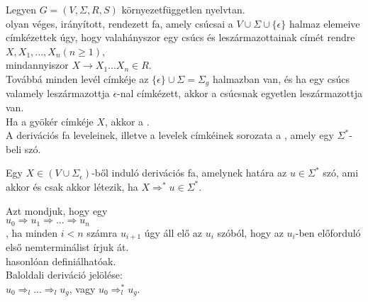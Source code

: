 \begin{frame}
\begin{tcolorbox}[title={Def.: Derivációs fa}]
Legyen $G = (V, {\Sigma}, R, S)$ környezetfüggetlen nyelvtan.\\
 olyan véges, irányított, rendezett fa, amely csúcsai a $V \cup {\Sigma} \cup \{{\epsilon}\}$ halmaz elemeive címkézettek úgy, hogy valahányszor egy csúcs és leszármazottainak címét rendre\\
\mmedskip
$X, X_1, ..., X_n (n \geq 1)$,\\
mindannyiszor $X \rightarrow X_1...X_n \in R$.\\
\mmedskip
Továbbá minden levél címkéje az $\{{\epsilon}\} \cup {\Sigma} = {\Sigma}_g$ halmazban van, és ha egy csúcs valamely leszármazottja $\epsilon$-nal címkézett, akkor a csúcsnak egyetlen leszármazottja van.\\
\mbigskip
Ha a gyökér címkéje $X$, akkor a .\\
\mbigskip
A derivációs fa leveleinek, illetve a levelek címkéinek sorozata a , amely egy ${\Sigma}^*$-beli szó.
\end{tcolorbox}
\end{frame}

\begin{frame}
\begin{tcolorbox}[title={Tétel: Derivációs fák}]
Egy $X \in (V \cup {\Sigma}_{\epsilon})$-ből induló derivációs fa, amelynek határa az $u \in {\Sigma}^*$ szó, ami akkor és csak akkor létezik, ha $X {\Rightarrow}^* u \in {\Sigma}^*$.
\end{tcolorbox}

\begin{tcolorbox}[title={Def.: Jobb-, Baloldali deriváció}]
Azt mondjuk, hogy egy\\
\mbigskip
$u_0 \Rightarrow u_1 \Rightarrow ... \Rightarrow u_n$\\
\mbigskip
{}, ha minden $i < n$ számra $u_{i + 1}$ úgy áll elő az $u_i$ szóból, hogy az $u_i$-ben előforduló első nemterminálist írjuk át.\\
\mbigskip
{} hasonlóan definiálhatóak.\\
\mbigskip
Baloldali deriváció jelölése:\\
\mbigskip
$u_0 {\Rightarrow}_l ... {\Rightarrow}_l u_g$, vagy $u_0 {\Rightarrow}^*_l u_g$.
\end{tcolorbox}
\end{frame}

